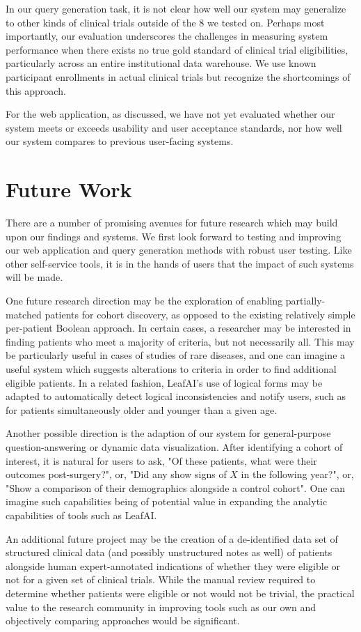 \documentclass[../main.tex]{subfiles}
\begin{document}
In our query generation task, it is not clear how well our system may generalize to other kinds of clinical trials outside of the 8 we tested on. Perhaps most importantly, our evaluation underscores the challenges in measuring system performance when there exists no true gold standard of clinical trial eligibilities, particularly across an entire institutional data warehouse. We use known participant enrollments in actual clinical trials but recognize the shortcomings of this approach.

For the web application, as discussed, we have not yet evaluated whether our system meets or exceeds usability and user acceptance standards, nor how well our system compares to previous user-facing systems. 

\section{Future Work}

There are a number of promising avenues for future research which may build upon our findings and systems. We first look forward to testing and improving our web application and query generation methods with robust user testing. Like other self-service tools, it is in the hands of users that the impact of such systems will be made.

One future research direction may be the exploration of enabling partially-matched patients for cohort discovery, as opposed to the existing relatively simple per-patient Boolean approach. In certain cases, a researcher may be interested in finding patients who meet a majority of criteria, but not necessarily all. This may be particularly useful in cases of studies of rare diseases, and one can imagine a useful system which suggests alterations to criteria in order to find additional eligible patients. In a related fashion, LeafAI's use of logical forms may be adapted to automatically detect logical inconsistencies and notify users, such as for patients simultaneously older and younger than a given age.

Another possible direction is the adaption of our system for general-purpose question-answering or dynamic data visualization. After identifying a cohort of interest, it is natural for users to ask, "Of these patients, what were their outcomes post-surgery?", or, "Did any show signs of $X$ in the following year?", or, "Show a comparison of their demographics alongside a control cohort". One can imagine such capabilities being of potential value in expanding the analytic capabilities of tools such as LeafAI.

An additional future project may be the creation of a de-identified data set of structured clinical data (and possibly unstructured notes as well) of patients alongside human expert-annotated indications of whether they were eligible or not for a given set of clinical trials. While the manual review required to determine whether patients were eligible or not would not be trivial, the practical value to the research community in improving tools such as our own and objectively comparing approaches would be significant.
\end{document}
